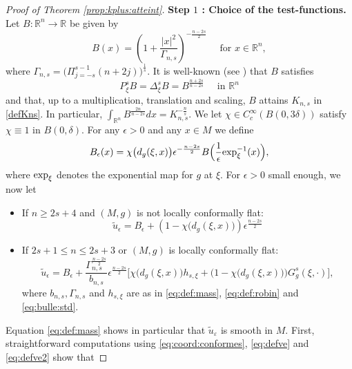 \documentclass[10pt]{amsart}
\numberwithin{equation}{section}
\newcommand{\R}{\mathbb{R}}
\def\ep{{\varepsilon}}
\def\exp{{\mathop{\rm exp}}}
\newcommand{\ve}{\varepsilon}
\def \ep{\epsilon}
\theoremstyle{plain}
\theoremstyle{remark}
\begin{document}
\begin{proof}[Proof of Theorem \ref{prop:kplus:atteint}]
\noindent \textbf{Step $1$ : Choice of the test-functions.} Let $B: \R^n \to \R$ be given by 
\begin{equation} \label{eq:bulle:std}
 B(x) = \left( 1 + \frac{|x|^2}{\Gamma_{n,s}} \right)^{- \frac{n-2s}{2}} \quad \text{ for } x \in \R^n, 
 \end{equation}
where $\Gamma_{n,s} = \Big(\Pi_{j=-s}^{s-1} (n+2j)  \Big)^{\frac{1}{s}}$. It is well-known (see \cite{LiebSharpConstants, MazumdarVetois}) that $B$ satisfies 
\begin{equation} \label{eq:Bbulle}
 P_{\xi}^s B = \Delta_\xi^s B = B^{\frac{n+2s}{n-2s}} \quad \text{ in } \R^n 
 \end{equation}
and that, up to a multiplication, translation and scaling, $B$ attains $K_{n,s}$ in \eqref{defKns}. In particular, $\int_{\R^n} B^{\frac{2n}{n-2s}}dx = K_{n,s}^{-\frac{n}{s}}$. We let $\chi \in C_c^\infty(B(0,3 \delta))$ satisfy $\chi \equiv 1$ in $B(0, \delta)$. For any $\epsilon >0$ and any $x \in M$ we define
\begin{equation}  \label{eq:defBeps}
 B_\ep(x) = \chi \big( d_g(\xi, x) \big) \ep^{- \frac{n-2s}{2}} B\Big( \frac{1}{\ep} \exp_{\xi}^{-1}(x) \Big), 
 \end{equation}
where $\exp_{\xi}$ denotes the exponential map for $g$ at $\xi$. For $\ep >0$ small enough, we now let 
\begin{itemize}
\item If $n \ge 2s+4$ and $(M,g)$ is not locally conformally flat: 
\begin{equation} \label{eq:defve}
\tilde{u}_\ep  = B_\ep + \left(1-\chi\big( d_g(\xi, x) \big)\right)\ep^{\frac{n-2s}{2}}  %
\end{equation}
\item If $2s+1 \le n \le 2s+3$ or $(M,g)$ is locally conformally flat:
\begin{equation} \label{eq:defve2}
\tilde{u}_\ep  = B_\ep + \frac{\Gamma_{n,s}^{\frac{n-2s}{2}}}{b_{n,s}}\ep^{\frac{n-2s}{2}} \Big[ \chi \big( d_g(\xi, x) \big) h_{s,\xi} + \big( 1 - \chi \big( d_g(\xi, x) \big)\big)G_g^s(\xi, \cdot) \Big],
\end{equation} 
where $b_{n,s}, \Gamma_{n,s}$ and $h_{s,\xi}$ are as in \eqref{eq:def:mass}, \eqref{eq:def:robin} and \eqref{eq:bulle:std}. 
\end{itemize}
Equation \eqref{eq:def:mass} shows in particular that $\tilde{u}_{\ve}$ is smooth in $M$. First, straightforward computations using \eqref{eq:coord:conformes}, \eqref{eq:defve} and \eqref{eq:defve2} show that 

\end{proof}
\end{document}
